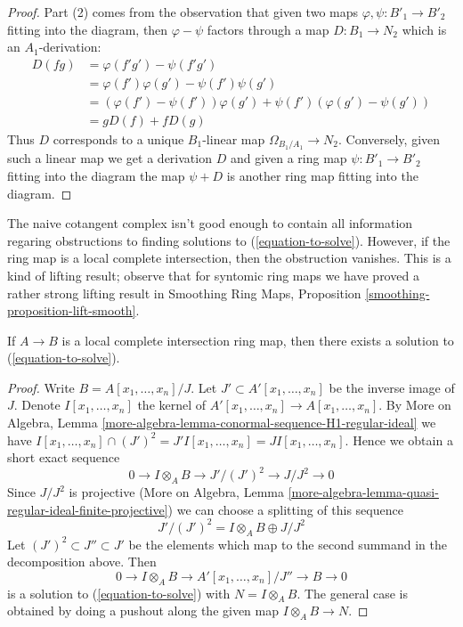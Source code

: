 \begin{proof}
\medskip\noindent
Part (2) comes from the observation that given two maps
$\varphi, \psi : B'_1 \to B'_2$ fitting into the diagram, then
$\varphi - \psi$ factors through a map $D : B_1 \to N_2$ which
is an $A_1$-derivation:
\begin{align*}
D(fg) & = \varphi(f'g') - \psi(f'g') \\
& =
\varphi(f')\varphi(g') - \psi(f')\psi(g') \\
& =
(\varphi(f') - \psi(f'))\varphi(g') + \psi(f')(\varphi(g') - \psi(g')) \\
& =
gD(f) + fD(g)
\end{align*}
Thus $D$ corresponds to a unique $B_1$-linear map
$\Omega_{B_1/A_1} \to N_2$. Conversely, given such a linear map
we get a derivation $D$ and given a ring map $\psi : B'_1 \to B'_2$
fitting into the diagram
the map $\psi + D$ is another ring map fitting into the diagram.
\end{proof}

\noindent
The naive cotangent complex isn't good enough to contain all information
regaring obstructions to finding solutions to (\ref{equation-to-solve}).
However, if the ring map is a local complete intersection, then the
obstruction vanishes. This is a kind of lifting result; observe that
for syntomic ring maps we have proved a rather strong lifting result in
Smoothing Ring Maps, Proposition \ref{smoothing-proposition-lift-smooth}.

\begin{lemma}
\label{lemma-existence-lci}
If $A \to B$ is a local complete intersection ring map, then
there exists a solution to (\ref{equation-to-solve}).
\end{lemma}

\begin{proof}
Write $B = A[x_1, \ldots, x_n]/J$. Let $J' \subset A'[x_1, \ldots, x_n]$
be the inverse image of $J$. Denote $I[x_1, \ldots, x_n]$ the
kernel of $A'[x_1, \ldots, x_n] \to A[x_1, \ldots, x_n]$.
By More on Algebra, Lemma
\ref{more-algebra-lemma-conormal-sequence-H1-regular-ideal} we have
$I[x_1, \ldots, x_n] \cap (J')^2 = J'I[x_1, \ldots, x_n] =
JI[x_1, \ldots, x_n]$. Hence we obtain a short exact sequence
$$
0 \to I \otimes_A B \to J'/(J')^2 \to J/J^2 \to 0
$$
Since $J/J^2$ is projective (More on Algebra, Lemma
\ref{more-algebra-lemma-quasi-regular-ideal-finite-projective})
we can choose a splitting of this sequence
$$
J'/(J')^2 = I \otimes_A B \oplus J/J^2 
$$
Let $(J')^2 \subset J'' \subset J'$ be the elements which map to the
second summand in the decomposition above. Then
$$
0 \to I \otimes_A B \to A'[x_1, \ldots, x_n]/J'' \to B \to 0
$$
is a solution to (\ref{equation-to-solve}) with $N = I \otimes_A B$.
The general case is obtained by doing a pushout along the given
map $I \otimes_A B \to N$.
\end{proof}

